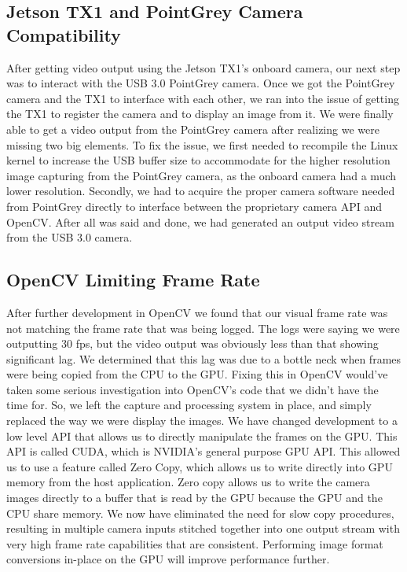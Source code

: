 \documentclass[letterpaper,10pt,titlepage]{IEEEtran}
\begin{document}
   \subsection{Jetson TX1 and PointGrey Camera Compatibility}
   After getting video output using the Jetson TX1's onboard camera, our next step was to interact with the USB 3.0 PointGrey camera. Once we got the PointGrey camera and the TX1 to interface with each other, we ran into the issue of getting the TX1 to register the camera and to display an image from it. We were finally able to get a video output from the PointGrey camera after realizing we were missing two big elements. To fix the issue, we first needed to recompile the Linux kernel to increase the USB buffer size to accommodate for the higher resolution image capturing from the  PointGrey camera, as the onboard camera had a much lower resolution. Secondly, we had to acquire the proper camera software needed from PointGrey directly to interface between the proprietary camera API and OpenCV. After all was said and done, we had generated an output video stream from the USB 3.0 camera. 
   
   \subsection{OpenCV Limiting Frame Rate}
   After further development in OpenCV we found that our visual frame rate was not matching the frame rate that was being logged. The logs were saying we were outputting 30 fps, but the video output was obviously less than that showing significant lag. We determined that this lag was due to a bottle neck when frames were being copied from the CPU to the GPU. Fixing this in OpenCV would've taken some serious investigation into OpenCV's code that we didn't have the time for. So, we left the capture and processing system in place, and simply replaced the way we were display the images. We have changed development to a low level API that allows us to directly manipulate the frames on the GPU. This API is called CUDA, which is NVIDIA's general purpose GPU API. This allowed us to use a feature called Zero Copy, which allows us to write directly into GPU memory from the host application. Zero copy allows us to write the camera images directly to a buffer that is read by the GPU because the GPU and the CPU share memory. We now have eliminated the need for slow copy procedures, resulting in multiple camera inputs stitched together into one output stream with very high frame rate capabilities that are consistent. Performing image format conversions in-place on the GPU will improve performance further.
   
\end{document}
